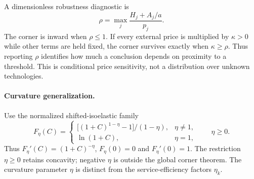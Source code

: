 A dimensionless robustness diagnostic is
\begin{equation}
 \rho=\max_j\frac{H_j+A_j/a}{p_j}.
 \label{eq:rho}
\end{equation}
The corner is inward when $\rho\leq1$. If every external price is multiplied by $\kappa>0$ while other terms are held fixed, the corner survives exactly when $\kappa\geq\rho$. Thus reporting $\rho$ identifies how much a conclusion depends on proximity to a threshold. This is conditional price sensitivity, not a distribution over unknown technologies.

\paragraph{Curvature generalization.}

Use the normalized shifted-isoelastic family
\begin{equation}
 F_\eta(C)=
 \begin{cases}
 \big[(1+C)^{1-\eta}-1\big]/(1-\eta),&\eta\neq1,\\
 \ln(1+C),&\eta=1,
 \end{cases}
 \qquad \eta\geq0.
 \label{eq:isoelastic}
\end{equation}
Thus $F_\eta'(C)=(1+C)^{-\eta}$, $F_\eta(0)=0$ and
$F_\eta'(0)=1$. The restriction $\eta\geq0$ retains concavity;
negative $\eta$ is outside the global corner theorem. The curvature
parameter $\eta$ is distinct from the service-efficiency factors $\eta_k$.


